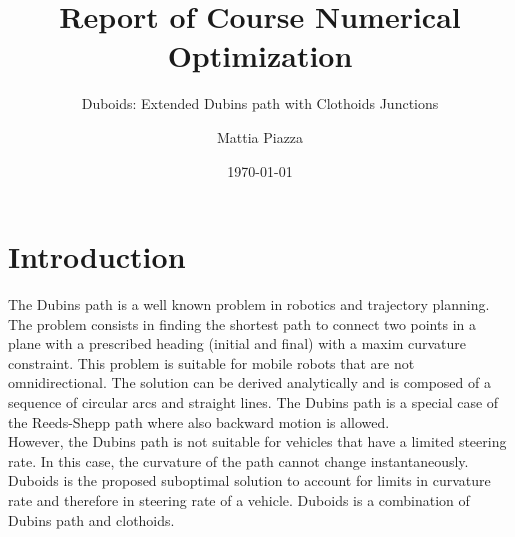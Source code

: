 \documentclass[11pt,twocolumn]{scrartcl}
\title{Report of Course Numerical Optimization}
\subtitle{Duboids: Extended Dubins path with Clothoids Junctions}
\author{Mattia Piazza}
\date{\today}
\begin{document}
\twocolumn[\maketitle ]
%
\section*{Introduction}
%
The Dubins path is a well known problem in robotics and trajectory planning. The problem consists in finding the shortest path to connect two points in a plane with a prescribed heading (initial and final) with a maxim curvature constraint. This problem is suitable for mobile robots that are not omnidirectional. The solution can be derived analytically and is composed of a sequence of circular arcs and straight lines.\cite{shkel2001classification,chen2019shortest,jha2020shortest} The Dubins path is a special case of the Reeds-Shepp path\cite{duits2018optimal} where also backward motion is allowed.\\
However, the Dubins path is not suitable for vehicles that have a limited steering rate. In this case, the curvature of the path cannot change instantaneously.\\
Duboids is the proposed suboptimal solution to account for limits in curvature rate and therefore in steering rate of a vehicle. Duboids is a combination of Dubins path and clothoids. 
%
\end{document}
